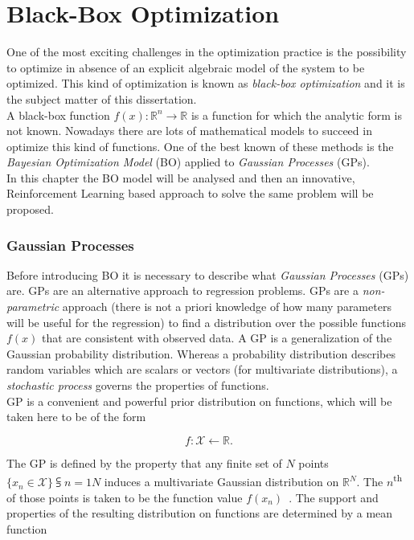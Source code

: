 \chapter{Black-Box Optimization}

One of the most exciting challenges in the optimization practice is the possibility to optimize in absence of an explicit algebraic model of the system to be optimized. This kind of optimization is known as \textit{black-box optimization} and it is the subject matter of this dissertation. \\

A black-box function $f(x) : \mathbb{R}^n \rightarrow \mathbb{R}$ is a function for which the analytic form is not known. Nowadays there are lots of mathematical models to succeed in optimize this kind of functions. One of the best known of these methods is the \textit{Bayesian Optimization Model} (BO) applied to \textit{Gaussian Processes} (GPs). \\

In this chapter the BO model will be analysed and then an innovative, Reinforcement Learning  based approach to solve the same problem will be proposed.

\subsection{Gaussian Processes} Before introducing BO it is necessary to describe what \textit{Gaussian Processes} (GPs) are. GPs are an alternative approach to regression problems. GPs are a \textit{non-parametric} approach (there is not a priori knowledge of how many parameters will be useful for the regression) to find a distribution over the possible functions $f(x)$ that are consistent with observed data. A GP is a generalization of the Gaussian probability distribution. Whereas a probability distribution describes random variables which are scalars or vectors (for multivariate distributions), a \textit{stochastic process} governs the properties of functions. \\

GP is a convenient and powerful prior distribution on functions, which will be taken here to be of the form 

\begin{equation}
	f : \mathcal{X} \leftarrow \mathbb{R}.
\end{equation}

The GP is defined by the property that any finite set of $N$ points $\{x_n \in \mathcal{X}\}\subsup{}{ n=1}{N}$ induces a multivariate Gaussian distribution  on $\mathbb{R}^N$. The $n$\textsuperscript{th} of those points is taken to be the function value $f(x_n)$~\cite{NIPS2012_4522}. The support and properties of the resulting distribution on functions are determined by a mean function 

